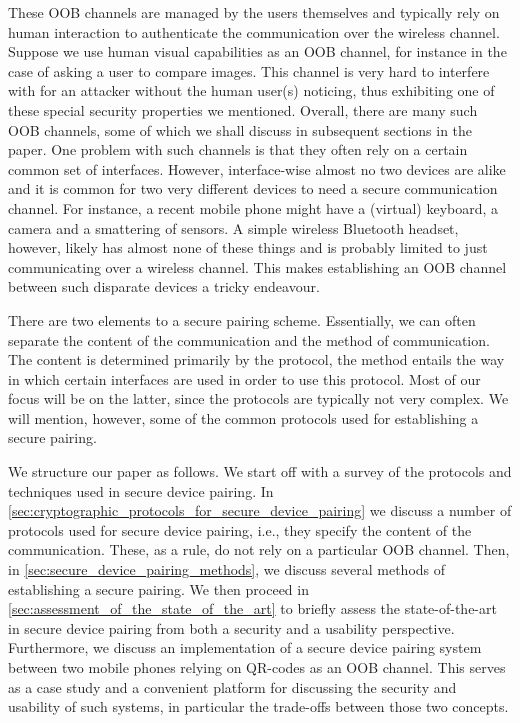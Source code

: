 \documentclass[conference, 11pt]{sty/IEEEtran}
\begin{document}
These OOB channels are managed by the users themselves and typically rely on human interaction to authenticate the communication over the wireless channel.
Suppose we use human visual capabilities as an OOB channel, for instance in the case of asking a user to compare images.
This channel is very hard to interfere with for an attacker without the human user(s) noticing, thus exhibiting one of these special security properties we mentioned.
Overall, there are many such OOB channels, some of which we shall discuss in subsequent sections in the paper.
One problem with such channels is that they often rely on a certain common set of interfaces.
However, interface-wise almost no two devices are alike and it is common for two very different devices to need a secure communication channel.
For instance, a recent mobile phone might have a (virtual) keyboard, a camera and a smattering of sensors.
A simple wireless Bluetooth headset, however, likely has almost none of these things and is probably limited to just communicating over a wireless channel.
This makes establishing an OOB channel between such disparate devices a tricky endeavour.

There are two elements to a secure pairing scheme.
Essentially, we can often separate the content of the communication and the method of communication.
The content is determined primarily by the protocol, the method entails the way in which certain interfaces are used in order to use this protocol.
Most of our focus will be on the latter, since the protocols are typically not very complex.
We will mention, however, some of the common protocols used for establishing a secure pairing.

We structure our paper as follows.
We start off with a survey of the protocols and techniques used in secure device pairing.
In \autoref{sec:cryptographic_protocols_for_secure_device_pairing} we discuss a number of protocols used for secure device pairing, i.e., they specify the content of the communication.
These, as a rule, do not rely on a particular OOB channel.
Then, in \autoref{sec:secure_device_pairing_methods}, we discuss several methods of establishing a secure pairing.
We then proceed in \autoref{sec:assessment_of_the_state_of_the_art} to briefly assess the state-of-the-art in secure device pairing from both a security and a usability perspective.
Furthermore, we discuss an implementation of a secure device pairing system between two mobile phones relying on QR-codes as an OOB channel.
This serves as a case study and a convenient platform for discussing the security and usability of such systems, in particular the trade-offs between those two concepts.
\end{document}
